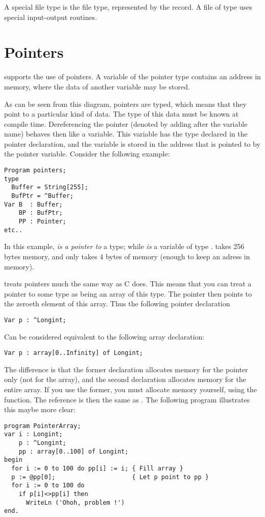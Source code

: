 \documentclass{report}
\begin{document}
A special file type is the  file type, represented by the
 record. A file of type  uses special input-output
routines.

\section{Pointers}
\fpc supports the use of pointers. A variable of the pointer type
contains an address in memory, where the data of another variable may be
stored.

As can be seen from this diagram, pointers are typed, which means that
they point to a particular kind of data. The type of this data must be
known at compile time.
Dereferencing the pointer (denoted by adding \var{\^{}} after the variable
name) behaves then like a variable. This variable has the type declared in
the pointer declaration, and the variable is stored in the address that is
pointed to by the pointer variable.
Consider the following example:
\begin{verbatim}
Program pointers;
type
  Buffer = String[255];
  BufPtr = ^Buffer;
Var B  : Buffer;
    BP : BufPtr;
    PP : Pointer;
etc..
\end{verbatim}
In this example,  {\em is a pointer to} a  type; while 
{\em is} a variable of type .  takes 256 bytes memory,
and  only takes 4 bytes of memory (enough to keep an adress in
memory).
\begin{remark} \fpc treats pointers much the same way as C does. This means
that you can treat a pointer to some type as being an array of this type.
The pointer then points to the zeroeth element of this array. Thus the
following pointer declaration
\begin{verbatim}
Var p : ^Longint;
\end{verbatim}
Can be considered equivalent to the following array declaration:
\begin{verbatim}
Var p : array[0..Infinity] of Longint;
\end{verbatim}
The difference is that the former declaration allocates memory for the
pointer only (not for the array), and the second declaration allocates
memory for the entire array. If you use the former, you must allocate memory
yourself, using the  function.
The reference  is then the same as . The following program
illustrates this maybe more clear:
\begin{verbatim}
program PointerArray;
var i : Longint;
    p : ^Longint;
    pp : array[0..100] of Longint;
begin
  for i := 0 to 100 do pp[i] := i; { Fill array }
  p := @pp[0];                     { Let p point to pp }
  for i := 0 to 100 do
    if p[i]<>pp[i] then
      WriteLn ('Ohoh, problem !')
end.
\end{verbatim}
\end{remark}
\end{document}
